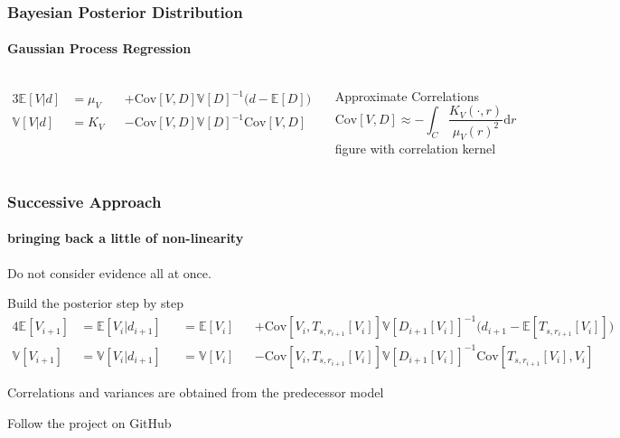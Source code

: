 \documentclass[aspectratio=169]{beamer}
\newcommand\Mean[1]{\mathbb{E}\!\left[#1\right]}
\newcommand\Var[1]{\mathbb{V}\!\left[#1\right]}
\newcommand\Cov[2]{\mathrm{Cov}\!\left[#1,#2\right]}
\begin{document}
\begin{frame}
    \frametitle{Bayesian Posterior Distribution}
    \framesubtitle{Gaussian Process Regression}

\begin{columns}
    \begin{alignat}{3}
        \Mean{V|d} &= \mu_V &&+ \Cov{V}{D} \Var{D}^{-1} \big( d - \Mean{D} \big)
        \\
        \Var{V|d}  &= K_V   &&- \Cov{V}{D} \Var{D}^{-1} \Cov{V}{D}
    \end{alignat}

    Approximate Correlations
    \begin{equation}
        \Cov{V}{D} \approx -\int_C \frac {K_V(\cdot,r)}{\mu_V(r)^2} \mathrm d r
    \end{equation}
    figure with correlation kernel
\end{columns}

\end{frame}

\begin{frame}
    \frametitle{Successive Approach}
    \framesubtitle{bringing back a little of non-linearity}

    Do not consider evidence all at once.

    Build the posterior step by step
    \begin{alignat}{4}
        \Mean{V_{i+1}} &=
        \Mean{V_i|d_{i+1}} &&=
        \Mean{V_i} &&+ \Cov{V_i}{T_{s,r_{i+1}}[V_i]} \Var{D_{i+1}[V_i]}^{-1} \big(d_{i+1} - \Mean{T_{s,r_{i+1}}[V_i]} \! \big)
        \\
        \Var{V_{i+1}} &=
        \Var{V_i|d_{i+1}} &&=
        \Var{V_i}  &&- \Cov{V_i}{T_{s,r_{i+1}}[V_i]} \Var{D_{i+1}[V_i]}^{-1} \Cov{T_{s,r_{i+1}}[V_i]}{V_i}
    \end{alignat}

    Correlations and variances are obtained from the predecessor model

\end{frame}


\begin{frame}[plain]
\end{frame}

\begin{frame}
    \hspace{15mm} Follow the project on GitHub \\[1cm]
    \hfill {} \hspace{20mm}
\end{frame}
\end{document}
